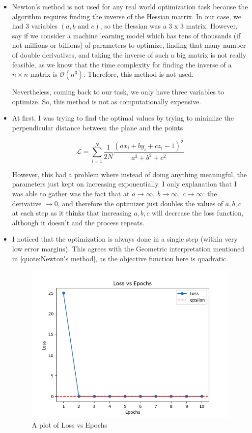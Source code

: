 \documentclass{report}
\begin{document}
\begin{itemize}
    \item Newton's method is not used for any real world optimization task because the algorithm requires finding the inverse of the Hessian matrix. In our case, we had 3 variables $(a, b \text{ and } c)$, so the Hessian was a 3 x 3 matrix. However, say if we consider a machine learning model which has tens of thousands (if not millions or billions) of parameters to optimize, finding that many number of double derivatives, and taking the inverse of such a big matrix is not really feasible, as we know that the time complexity for finding the inverse of a $n \times n$ matrix is $\mathcal{O} (n^3)$. Therefore, this method is not used.

          Nevertheless, coming back to our task, we only have three variables to optimize. So, this method is not as computationally expensive.

    \item At first, I was trying to find the optimal values by trying to minimize the perpendicular distance between the plane and the points

          $$\mathcal{L} = \sum_{i = 1}^{N}{\frac{1}{2N}\frac{(ax_i+by_i+cz_i-1)^2}{a^2+b^2+c^2}}$$

          However, this had a problem where instead of doing anything meaningful, the parameters just kept on increasing exponentially. I only explanation that I was able to gather was the fact that at $a\longrightarrow\infty, \ b\longrightarrow\infty, \ c\longrightarrow\infty$: the derivative $\longrightarrow0$, and therefore the optimizer just doubles the values of $a, b, c$ at each step as it thinks that increasing $a, b, c$ will decrease the loss function, although it doesn't and the process repeats.

    \item I noticed that the optimization is always done in a single step (within very low error margins). This agrees with the Geometric interpretation mentioned in \ref{quote:Newton's method}, as the objective function here is quadratic.
          \begin{figure}[H]
              \centering
              \includegraphics[width=0.5\linewidth]{loss_points.png}
              \caption{A plot of Loss vs Epochs}
              \label{fig:loss_points}
          \end{figure}


\end{itemize}
\end{document}

